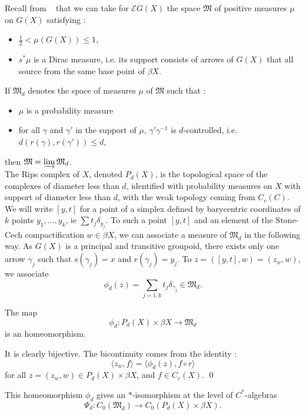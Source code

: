 Recall from ~\cite{TuNovikov} that we can take for $\mathcal E G(X) $ the space $\mathfrak M$ of positive measures $\mu$ on $G(X)$ satisfying :
\begin{itemize}
\item $\frac{1}{2}<\mu(G(X))\leq 1$, 
\item $s^*\mu$ is a Dirac measure, i.e. its support consists of arrows of $G(X)$ that all source from the same base point of $\beta X$.\\
\end{itemize}

If $\mathfrak M_d$ denotes the space of measures $\mu$ of $\mathfrak M$ such that :
\begin{itemize}
\item $\mu$ is a probability measure
\item for all $\gamma$ and $\gamma'$ in the support of $\mu$, $\gamma'\gamma^{-1}$ is $d$-controlled, i.e. $d(r(\gamma),r(\gamma'))\leq d$, 
\end{itemize}
then $\mathfrak M=\varinjlim \mathfrak M_d$.\\ %

The Rips complex of $X$, denoted $P_d(X)$, is the topological space of the complexes of diameter less than $d$, identified with probability measures on $X$ with support of diameter less than $d$, with the weak topology coming from $C_c(C)$. We will write $[y,t]$ for a point of a simplex defined by barycentric coordinates of $k$ points $y_1,...,y_k$, ie $\sum t_j \delta_{y_j}$. To such a point $[y,t]$ and an element of the Stone-Cech compactification $w\in \beta X$, we can associate a measure of $\mathfrak M_d$ in the following way. As $G(X)$ is a principal and transitive groupoid, there exists only one arrow $\gamma_j$ such that $s(\gamma_j)=x$ and $r(\gamma_j)=y_j$. To $z=([y,t],w)=(z_w,w)$, we associate 
\[\phi_d(z)=\sum_{j=1,k} t_j \delta_{\gamma_j}\in\mathfrak M_d.\]

\begin{prop}
The map
\[\phi_d: P_d(X)\times \beta X \rightarrow \mathfrak M_d\]
is an homeomorphism.
\end{prop}
\begin{dem}
It is clearly bijective. The bicontinuity comes from the identity :
\[\langle z_w,f\rangle=\langle \phi_d(z),f\circ r\rangle\]
for all $z=(z_w,w)\in P_d(X)\times \beta X$, and $f\in C_c(X)$.
\qed
\end{dem}

This homeomorphism $\phi_d$ gives an $*$-isomorphism at the level of $C^*$-algebras
\[\Psi_d : C_0(\mathfrak M_d)\rightarrow C_0(P_d(X)\times \beta X).\]

